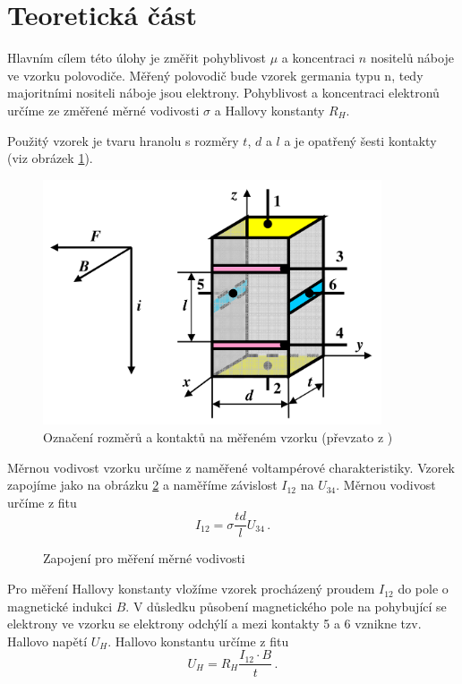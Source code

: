 \section*{Teoretická část}

Hlavním cílem této úlohy je změřit pohyblivost $\mu$ a koncentraci $n$ nositelů náboje ve vzorku polovodiče.
Měřený polovodič bude vzorek germania typu n, tedy majoritními nositeli náboje jsou elektrony.
Pohyblivost a koncentraci elektronů určíme ze změřené měrné vodivosti $\sigma$ a Hallovy konstanty $R_H$.

Použitý vzorek je tvaru hranolu s rozměry $t$, $d$ a $l$ a je opatřený šesti kontakty (viz obrázek \ref{obr:vzorek}).

\begin{figure}[htbp]
\centering
\includegraphics[width=100mm,scale=0.5]{graficos/vzorek}
\caption{Označení rozměrů a kontaktů na měřeném vzorku (převzato z \cite{skripta})}
\label{obr:vzorek}
\end{figure}

Měrnou vodivost vzorku určíme z naměřené voltampérové charakteristiky.
Vzorek zapojíme jako na obrázku \ref{obr:schemaodpor} a naměříme závislost $I_{12}$ na $U_{34}$.
Měrnou vodivost určíme z fitu
\begin{equation}
I_{12}=\sigma \frac{td}{l} U_{34} \,.
\end{equation}

\begin{figure}[htbp]
\centering
\caption{Zapojení pro měření měrné vodivosti}
\label{obr:schemaodpor}
\end{figure}

Pro měření Hallovy konstanty vložíme vzorek procházený proudem $I_{12}$ do pole o magnetické indukci $B$.
V důsledku působení magnetického pole na pohybující se elektrony ve vzorku se elektrony odchýlí a mezi kontakty 5 a 6 vznikne tzv. Hallovo napětí $U_H$.
Hallovo konstantu určíme z fitu \cite{skripta}
\begin{equation}
U_H=R_H\frac{I_{12} \cdot B}{t} \,.
\end{equation}

